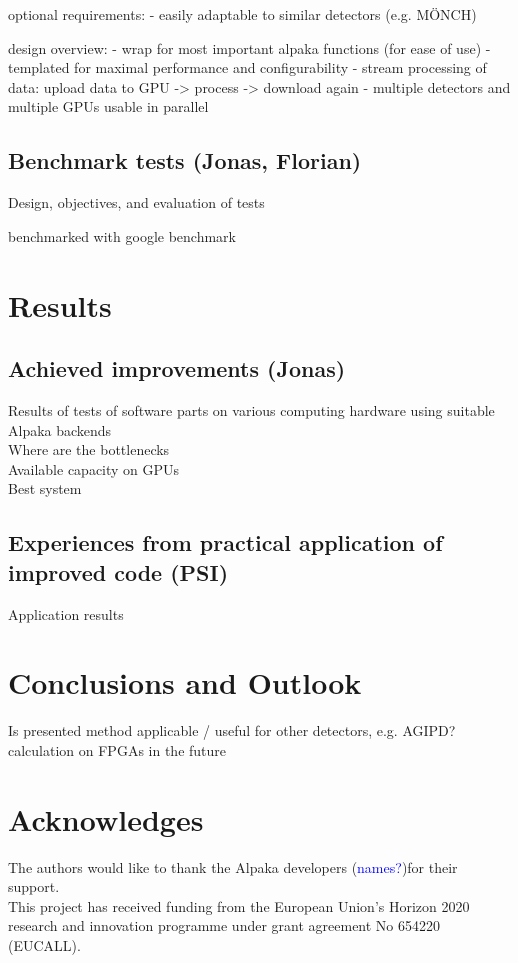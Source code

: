 \documentclass[a4paper]{article}
\begin{document}
optional requirements:
 - easily adaptable to similar detectors (e.g. MÖNCH)

design overview:
 - wrap for most important alpaka functions (for ease of use)
 - templated for maximal performance and configurability
 - stream processing of data: upload data to GPU -> process -> download again
 - multiple detectors and multiple GPUs usable in parallel


\subsection{Benchmark tests (Jonas, Florian)}
\label{subsec:benchmark}
Design, objectives, and evaluation of tests

benchmarked with google benchmark

\section{Results}
\label{sec:results}
\subsection{Achieved improvements (Jonas)}
Results of tests of software parts on various computing hardware using suitable Alpaka backends\\

Where are the bottlenecks\\

Available capacity on GPUs\\

Best system

\subsection{Experiences from practical application of improved code (PSI)}
Application results

\section{Conclusions and Outlook}
\label{sec:conclusions}
Is presented method applicable / useful for other detectors, e.g. AGIPD? \\

calculation on FPGAs in the future


\section{Acknowledges}
The authors would like to thank  the Alpaka developers (\textcolor{blue}{names?})for their support.\\

This project has received funding from the European Union's Horizon 2020 research and innovation programme under grant agreement No 654220 (EUCALL).

\newpage

\begin{sloppypar}
\printbibliography
\end{sloppypar}
\end{document}
